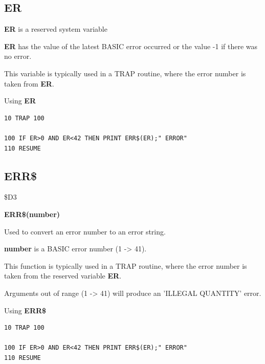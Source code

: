 \subsection{ER}
\begin{description}[leftmargin=2cm,style=nextline]
\item [Format:] {\bf ER} is a reserved system variable
\item [Usage:]  {\bf ER} has the value of the latest BASIC error
               occurred or the value -1 if there was no error.

This variable is typically used in a TRAP routine,
where the error number is taken from {\bf ER}.

\item [Example:] Using {\bf ER}
\begin{tcolorbox}[colback=black,coltext=white]
\verbatimfont{\codefont}
\begin{verbatim}
10 TRAP 100

100 IF ER>0 AND ER<42 THEN PRINT ERR$(ER);" ERROR"
110 RESUME
\end{verbatim}
\end{tcolorbox}
\end{description}


\newpage
\subsection{ERR\$}
\begin{description}[leftmargin=2cm,style=nextline]
\item [Token:] \$D3
\item [Format:] {\bf ERR\$(number)}
\item [Usage:] Used to convert
               an error number to an error string.

   {\bf number} is a BASIC error number (1 -> 41).

This function is typically used in a TRAP routine,
where the error number is taken from the reserved variable {\bf ER}.

\item [Remarks:] Arguments out of range (1 -> 41) will
                 produce an 'ILLEGAL QUANTITY' error.

\item [Example:] Using {\bf ERR\$}
\begin{tcolorbox}[colback=black,coltext=white]
\verbatimfont{\codefont}
\begin{verbatim}
10 TRAP 100

100 IF ER>0 AND ER<42 THEN PRINT ERR$(ER);" ERROR"
110 RESUME
\end{verbatim}
\end{tcolorbox}
\end{description}

